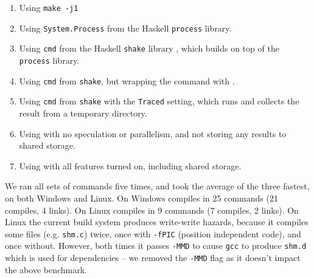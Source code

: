 \begin{enumerate}
\item Using \texttt{make -j1}
\item Using \texttt{System.Process} from the Haskell \texttt{process} library.
\item Using \texttt{cmd} from the Haskell \texttt{shake} library \cite{shake}, which builds on top of the \texttt{process} library.
\item Using \texttt{cmd} from \texttt{shake}, but wrapping the command with \Fsatrace.
\item Using \texttt{cmd} from \texttt{shake} with the \texttt{Traced} setting, which runs \Fsatrace and collects the result from a temporary directory.
\item Using \Rattle with no speculation or parallelism, and not storing any results to shared storage.
\item Using \Rattle with all features turned on, including shared storage.
\end{enumerate}

We ran all sets of commands five times, and took the average of the three fastest, on both Windows and Linux. On Windows \Fsatrace compiles in 25 commands (21 compiles, 4 links). On Linux \Fsatrace compiles in 9 commands (7 compiles, 2 links). On Linux the current build system produces write-write hazards, because it compiles some files (e.g. \texttt{shm.c}) twice, once with \texttt{-fPIC} (position independent code), and once without. However, both times it passes \texttt{-MMD} to cause \texttt{gcc} to produce \texttt{shm.d} which is used for dependencies -- we removed the \texttt{-MMD} flag as it doesn't impact the above benchmark.


